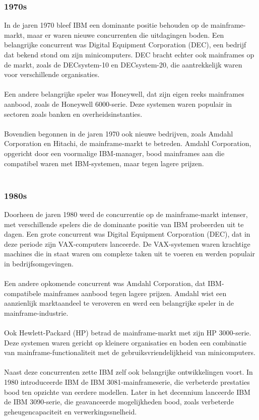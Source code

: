 \subsubsection{1970s}
\label{sec:1970s}
In de jaren 1970 bleef IBM een dominante positie behouden op de mainframe-markt, maar er waren nieuwe concurrenten die uitdagingen boden. Een belangrijke concurrent was Digital Equipment Corporation (DEC), een bedrijf dat bekend stond om zijn minicomputers. DEC bracht echter ook mainframes op de markt, zoals de DECsystem-10 en DECsystem-20, die aantrekkelijk waren voor verschillende organisaties. \autocite{Society2015}
\\ \\
Een andere belangrijke speler was Honeywell, dat zijn eigen reeks mainframes aanbood, zoals de Honeywell 6000-serie. Deze systemen waren populair in sectoren zoals banken en overheidsinstanties. \autocite{Society2015}
\\ \\
Bovendien begonnen in de jaren 1970 ook nieuwe bedrijven, zoals Amdahl Corporation en Hitachi, de mainframe-markt te betreden. Amdahl Corporation, opgericht door een voormalige IBM-manager, bood mainframes aan die compatibel waren met IBM-systemen, maar tegen lagere prijzen. \autocite{Society2015}
\\ \\
\subsubsection{1980s}
\label{sec:1980s}
Doorheen de jaren 1980 werd de concurrentie op de mainframe-markt intenser, met verschillende spelers die de dominante positie van IBM probeerden uit te dagen. Een grote concurrent was Digital Equipment Corporation (DEC), dat in deze periode zijn VAX-computers lanceerde. De VAX-systemen waren krachtige machines die in staat waren om complexe taken uit te voeren en werden populair in bedrijfsomgevingen. \autocite{Society2015}
\\ \\
Een andere opkomende concurrent was Amdahl Corporation, dat IBM-compatibele mainframes aanbood tegen lagere prijzen. Amdahl wist een aanzienlijk marktaandeel te veroveren en werd een belangrijke speler in de mainframe-industrie. \autocite{Society2015}
\\ \\
Ook Hewlett-Packard (HP) betrad de mainframe-markt met zijn HP 3000-serie. Deze systemen waren gericht op kleinere organisaties en boden een combinatie van mainframe-functionaliteit met de gebruiksvriendelijkheid van minicomputers. \autocite{Society2015}
\\ \\
Naast deze concurrenten zette IBM zelf ook belangrijke ontwikkelingen voort. In 1980 introduceerde IBM de IBM 3081-mainframeserie, die verbeterde prestaties bood ten opzichte van eerdere modellen. Later in het decennium lanceerde IBM de IBM 3090-serie, die geavanceerde mogelijkheden bood, zoals verbeterde geheugencapaciteit en verwerkingssnelheid. \autocite{Society2015}
\\ \\

